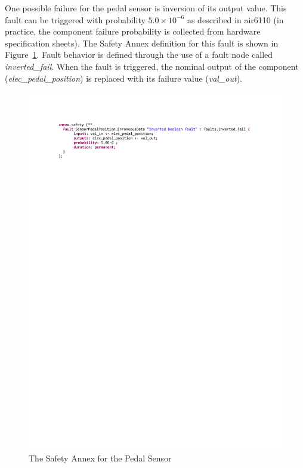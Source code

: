 One possible failure for the pedal sensor is inversion of its output value. This fault can be triggered with probability $5.0\times 10^{-6}$ as described in \gls{air}6110 (in practice, the component failure probability is 
collected from hardware specification sheets).  
The Safety Annex definition for this fault is shown in Figure~\ref{fig:sensorFault}. Fault behavior is defined through the use of a fault node called \textit{inverted\_fail}.  When the fault is triggered, the nominal output of the component (\textit{elec\_pedal\_position}) is replaced with its failure value (\textit{val\_out}). 

\begin{figure}[h!]
	\hspace*{-2cm}
	\begin{center}
		\includegraphics[trim=0 680 -10 70,clip,width=1.5\dimexpr\textwidth-2cm\relax]{images/safetyannex_sensorfault.pdf}
		\vspace{-0.2in}
		\caption{The Safety Annex for the Pedal Sensor}
		\label{fig:sensorFault}
	\end{center}
	\vspace{-0.2in}
\end{figure}

